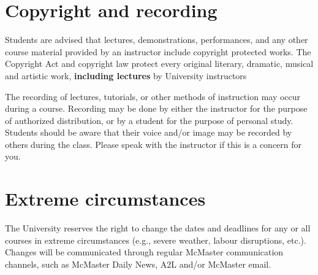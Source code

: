 \documentclass[12pt]{article}
\begin{document}
\section*{Copyright and recording}

Students are advised that lectures, demonstrations, performances, and
any other course material provided by an instructor include copyright
protected works. The Copyright Act and copyright law protect every
original literary, dramatic, musical and artistic work,
\textbf{including lectures} by University instructors

The recording of lectures, tutorials, or other methods of instruction
may occur during a course. Recording may be done by either the
instructor for the purpose of authorized distribution, or by a student
for the purpose of personal study. Students should be aware that their
voice and/or image may be recorded by others during the class. Please
speak with the instructor if this is a concern for you.

\section*{Extreme circumstances}

The University reserves the right to change the dates and deadlines for
any or all courses in extreme circumstances (e.g., severe weather,
labour disruptions, etc.). Changes will be communicated through regular
McMaster communication channels, such as McMaster Daily News, A2L and/or
McMaster email.
\end{document}
